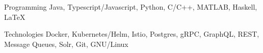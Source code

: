 

\begin{cvskills}

  \cvskill
    {Programming} %
    {Java, Typescript/Javascript, Python, C/C++, MATLAB, Haskell, LaTeX} %

  \cvskill
    {Technologies} %
    {Docker, Kubernetes/Helm, Istio, Postgres, gRPC, GraphQL, REST, Message Queues, Solr, Git, GNU/Linux} %

\end{cvskills}